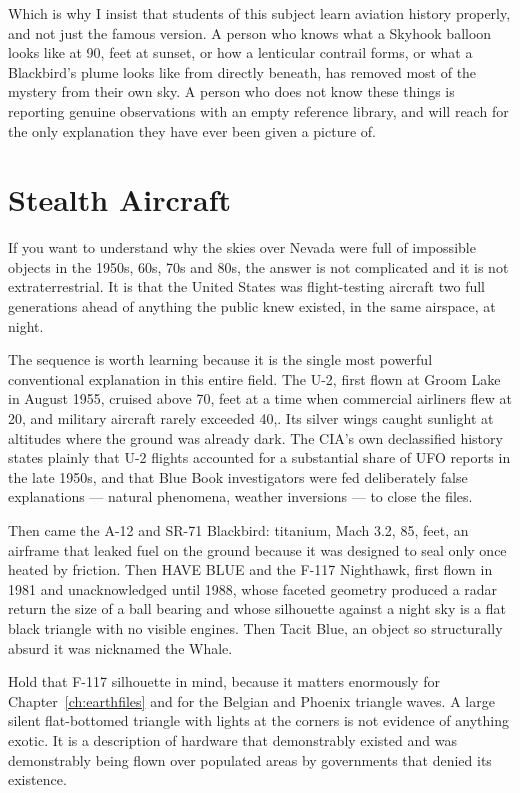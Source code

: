 Which is why I insist that students of this subject learn aviation history properly, and not just
the famous version. A person who knows what a Skyhook balloon looks like at 90, feet at sunset,
or how a lenticular contrail forms, or what a Blackbird's plume looks like from directly beneath,
has removed most of the mystery from their own sky. A person who does not know these things is
reporting genuine observations with an empty reference library, and will reach for the only
explanation they have ever been given a picture of.

\section{Stealth Aircraft}\label{sec:stealthaircraft}

If you want to understand why the skies over Nevada were full of impossible objects in the
1950s, 60s, 70s and 80s, the answer is not complicated and it is not extraterrestrial. It
is that the United States was flight-testing aircraft two full generations ahead of
anything the public knew existed, in the same airspace, at night.

The sequence is worth learning because it is the single most powerful conventional
explanation in this entire field. The U-2, first flown at Groom Lake in August 1955,
cruised above 70, feet at a time when commercial airliners flew at 20, and
military aircraft rarely exceeded 40,. Its silver wings caught sunlight at altitudes
where the ground was already dark. The CIA's own declassified history states plainly that
U-2 flights accounted for a substantial share of UFO reports in the late 1950s, and that
Blue Book investigators were fed deliberately false explanations --- natural phenomena,
weather inversions --- to close the files.

Then came the A-12 and SR-71 Blackbird: titanium, Mach 3.2, 85, feet, an airframe
that leaked fuel on the ground because it was designed to seal only once heated by
friction. Then HAVE BLUE and the F-117 Nighthawk, first flown in 1981 and unacknowledged
until 1988, whose faceted geometry produced a radar return the size of a ball bearing and
whose silhouette against a night sky is a flat black triangle with no visible engines.
Then Tacit Blue, an object so structurally absurd it was nicknamed the Whale.

Hold that F-117 silhouette in mind, because it matters enormously for
Chapter~\ref{ch:earthfiles} and for the Belgian and Phoenix triangle waves. A large silent
flat-bottomed triangle with lights at the corners is not evidence of anything exotic. It
is a description of hardware that demonstrably existed and was demonstrably being flown
over populated areas by governments that denied its existence.

